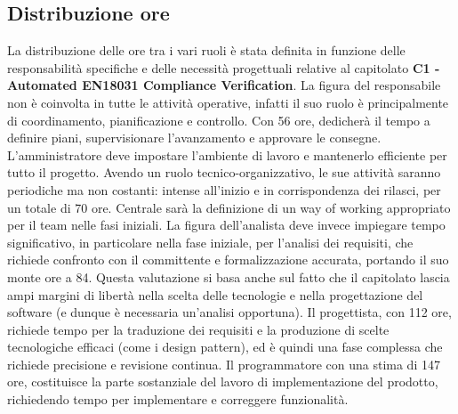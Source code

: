 \documentclass[a4paper,12pt]{article}
\begin{document}
{    \subsection{Distribuzione ore}{
        La distribuzione delle ore tra i vari ruoli è stata definita in funzione delle responsabilità specifiche e delle necessità progettuali relative al capitolato \textbf{C1 - Automated EN18031 Compliance Verification}.
        \vspace{0.3cm}
        \newline
        La figura del responsabile non è coinvolta in tutte le attività operative, infatti il suo ruolo è principalmente di coordinamento, pianificazione e controllo. Con 56 ore, dedicherà il tempo a definire piani, supervisionare l'avanzamento e approvare le consegne.
        \vspace{0.3cm}
        \newline
        L'amministratore deve impostare l'ambiente di lavoro e mantenerlo efficiente per tutto il progetto. Avendo un ruolo tecnico-organizzativo, le sue attività saranno periodiche ma non costanti: intense all'inizio e in corrispondenza dei rilasci, per un totale di 70 ore. Centrale sarà la definizione di un way of working appropriato per il team nelle fasi iniziali.
        \vspace{0.3cm}
        \newline
        La figura dell'analista deve invece impiegare tempo significativo, in particolare nella fase iniziale, per l'analisi dei requisiti, che richiede confronto con il committente e formalizzazione accurata, portando il suo monte ore a 84. Questa valutazione si basa anche sul fatto che il capitolato lascia ampi margini di libertà nella scelta delle tecnologie e nella progettazione del software (e dunque è necessaria un'analisi opportuna).
        \vspace{0.3cm}
        \newline
        Il progettista, con 112 ore, richiede tempo per la traduzione dei requisiti e la produzione di scelte tecnologiche efficaci (come i design pattern), ed è quindi una fase complessa che richiede precisione e revisione continua.
        \vspace{0.3cm}
        \newline
        Il programmatore con una stima di 147 ore, costituisce la parte sostanziale del lavoro di implementazione del prodotto, richiedendo tempo per implementare e correggere funzionalità.
        \vspace{0.3cm}
        \newline
}}
\end{document}
